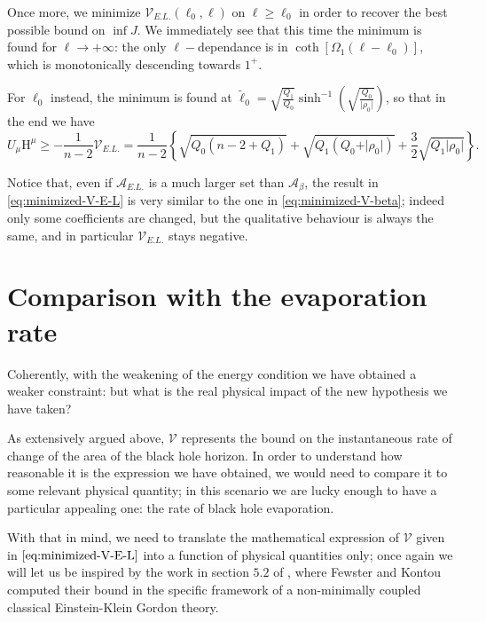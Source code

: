 Once more, we minimize \(\mathcal{V}_{E.L.}(\ell_0, \ell)\) on \(\ell \ge \ell_0\) in order to recover the best possible bound on \(\inf J\). We immediately see that this time the minimum is found for \(\ell \rightarrow +\infty\): the only \(\ell-\)dependance is in \(\coth\left[\Omega_1(\ell- \ell_0)\right]\), which is monotonically descending towards \(1^+\).

For \(\ell_0\) instead, the minimum is found at \(\tilde{\ell}_0 = \sqrt{\frac{Q_1}{Q_0}}\sinh^{-1}\left(\sqrt{\frac{Q_0}{\vert\rho_0\vert}}\right)\), so that in the end we have
{\small
\begin{equation}
	\label{eq:minimized-V-E-L}
	U_{\mu}\mathrm{H}^{\mu} \ge - \frac{1}{n - 2}\mathcal{V}_{E.L.} =  \frac{1}{n - 2} \left\{ \sqrt{Q_0(n - 2 + Q_1)} + \sqrt{Q_1(Q_0 + \vert\rho_0\vert)} + \frac{3}{2}\sqrt{Q_1\vert\rho_0\vert} \right\}.
\end{equation}}

Notice that, even if \(\mathcal{A}_{E.L.}\) is a much larger set than \(\mathcal{A}_{\beta}\), the result in \eqref{eq:minimized-V-E-L} is very similar to the one in \eqref{eq:minimized-V-beta}; indeed only some coefficients are changed, but the qualitative behaviour is always the same, and in particular \(\mathcal{V}_{E.L.}\) stays negative.

\section{Comparison with the evaporation rate}
\label{sec:physical-interpretation-V}

Coherently, with the weakening of the energy condition we have obtained a weaker constraint: but what is the real physical impact of the new hypothesis we have taken?

As extensively argued above, \(\mathcal{V}\) represents the bound on the instantaneous rate of change of the area of the black hole horizon. In order to understand how reasonable it is the expression we have obtained, we would need to compare it to some relevant physical quantity; in this scenario we are lucky enough to have a particular appealing one: the rate of black hole evaporation.

With that in mind, we need to translate the mathematical expression of \(\mathcal{V}\) given in \(\eqref{eq:minimized-V-E-L}\) into a function of physical quantities only; once again we will let us be inspired by the work in section \(5.2\) of \cite{fewster2020new}, where Fewster and Kontou computed their bound in the specific framework of a non-minimally coupled classical Einstein-Klein Gordon theory.

